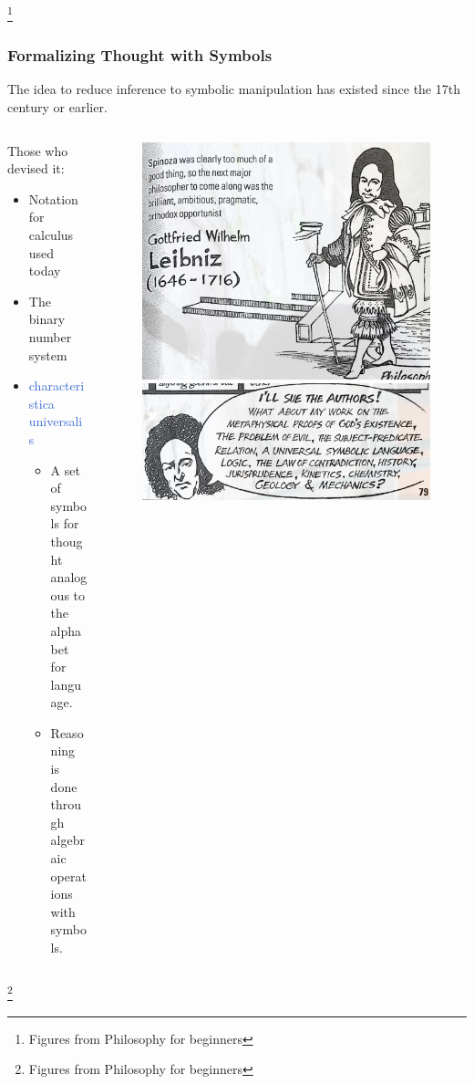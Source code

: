 \documentclass[unicode, 14pt, aspectratio=169]{beamer}
\newcommand\blfootnote[1]{%
  \begingroup
  \renewcommand\thefootnote{}\footnote{#1}%
  \addtocounter{footnote}{-1}%
  \endgroup
}
\begin{document}
\begin{frame}
\begin{columns}
\begin{column}{0.2\textwidth}
\begin{figure}
      \end{figure}       
    \end{column} 
  \end{columns}
  \blfootnote{Figures from Philosophy for beginners\supercite{philosophy-for-begginers}}
\end{frame}
\begin{frame}
  \frametitle{Formalizing Thought with Symbols}
  {\large The idea to reduce inference to symbolic manipulation has existed since the 17th century or earlier.}  
  \begin{columns}
    \begin{column}{0.55\textwidth}
      Those who devised it:
      \begin{itemize}
        \item Notation for calculus used today
        \item The binary number system
        \item \textcolor{highlight}{characteristica universalis}
          \begin{itemize}
          \item A set of symbols for thought analogous to the alphabet for language.
          \item Reasoning is done through algebraic operations with symbols.
          \end{itemize}
      \end{itemize}
    \end{column}    
    \begin{column}{0.4\textwidth}
      \begin{figure}
        \includegraphics[width=0.7\linewidth]{images/leibniz.png}
        \includegraphics[width=0.7\linewidth]{images/universal.png}
      \end{figure}       
    \end{column} 
  \end{columns}
  \blfootnote{Figures from Philosophy for beginners\supercite{philosophy-for-begginers}}  
\end{frame}
\end{document}
